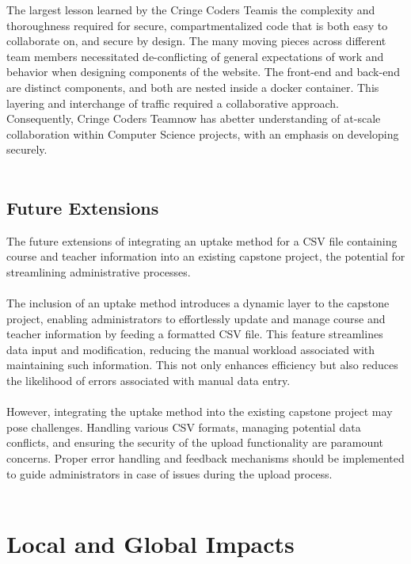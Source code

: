 \documentclass[oneside,openany,obeyspaces]{book}
\newcommand\tab[1][1cm]{\hspace*{#1}}
\newcommand\TeamName{Cringe Coders Team}
\begin{document}
\begin{flushleft}
    \tab The largest lesson learned by the \TeamName\space is the complexity and thoroughness required for secure, compartmentalized code that is both easy to collaborate on, and secure by design. The many moving pieces across different team members necessitated de-conflicting of general expectations of work and behavior when designing components of the website. The front-end and back-end are distinct components, and both are nested inside a docker container. This layering and interchange of traffic required a collaborative approach. Consequently, \TeamName now has abetter understanding of at-scale collaboration within Computer Science projects, with an emphasis on developing securely. \\~\\


    \section{Future Extensions}

    \tab The future extensions of integrating an uptake method for a CSV file containing course and teacher information into an existing capstone project, the potential for streamlining administrative processes.\\~\\

    \tab The inclusion of an uptake method introduces a dynamic layer to the capstone project, enabling administrators to effortlessly update and manage course and teacher information by feeding a formatted CSV file. This feature streamlines data input and modification, reducing the manual workload associated with maintaining such information. This not only enhances efficiency but also reduces the likelihood of errors associated with manual data entry.\\~\\

    \tab However, integrating the uptake method into the existing capstone project may pose challenges. Handling various CSV formats, managing potential data conflicts, and ensuring the security of the upload functionality are paramount concerns. Proper error handling and feedback mechanisms should be implemented to guide administrators in case of issues during the upload process.\\~\\




    \chapter{Local and Global Impacts}


\end{flushleft}
\end{document}
